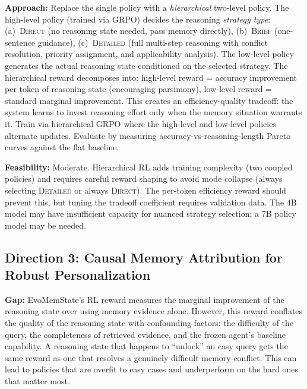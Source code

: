 \documentclass[11pt,a4paper]{article}
\begin{document}
\textbf{Approach:} Replace the single policy with a \emph{hierarchical} two-level policy. The high-level policy (trained via GRPO) decides the reasoning \emph{strategy type}: (a)~\textsc{Direct} (no reasoning state needed, pass memory directly), (b)~\textsc{Brief} (one-sentence guidance), (c)~\textsc{Detailed} (full multi-step reasoning with conflict resolution, priority assignment, and applicability analysis). The low-level policy generates the actual reasoning state conditioned on the selected strategy. The hierarchical reward decomposes into: high-level reward = accuracy improvement per token of reasoning state (encouraging parsimony), low-level reward = standard marginal improvement. This creates an efficiency-quality tradeoff: the system learns to invest reasoning effort only when the memory situation warrants it. Train via hierarchical GRPO where the high-level and low-level policies alternate updates. Evaluate by measuring accuracy-vs-reasoning-length Pareto curves against the flat baseline.

\textbf{Feasibility:} Moderate. Hierarchical RL adds training complexity (two coupled policies) and requires careful reward shaping to avoid mode collapse (always selecting \textsc{Detailed} or always \textsc{Direct}). The per-token efficiency reward should prevent this, but tuning the tradeoff coefficient requires validation data. The 4B model may have insufficient capacity for nuanced strategy selection; a 7B policy model may be needed.

\subsection{Direction 3: Causal Memory Attribution for Robust Personalization}
\textbf{Gap:} EvoMemState's RL reward measures the marginal improvement of the reasoning state over using memory evidence alone. However, this reward conflates the quality of the reasoning state with confounding factors: the difficulty of the query, the completeness of retrieved evidence, and the frozen agent's baseline capability. A reasoning state that happens to ``unlock'' an easy query gets the same reward as one that resolves a genuinely difficult memory conflict. This can lead to policies that are overfit to easy cases and underperform on the hard ones that matter most.
\end{document}
